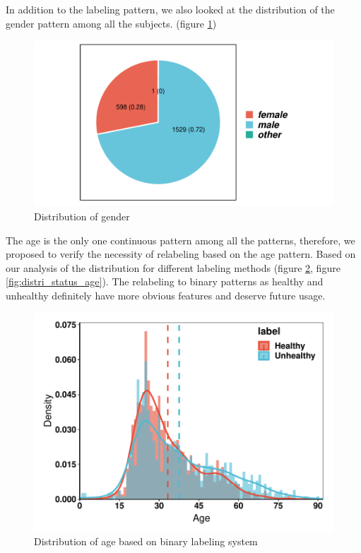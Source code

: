 \documentclass[11pt]{article}
\begin{document}
In addition to the labeling pattern, we also looked at the distribution of the gender pattern among all the subjects. (figure \ref{fig:pie_gender})

\begin{figure}[htbp]{}
	\centering
    \includegraphics[width=.8\textwidth]{./imgs/pie_gender.pdf} %
    \caption{Distribution of gender}
    \label{fig:pie_gender}
\end{figure}

The age is the only one continuous pattern among all the patterns, therefore, we proposed to verify the necessity of relabeling based on the age pattern. Based on our analysis of the distribution for different labeling methods (figure \ref{fig:distri_label_age}, figure \ref{fig:distri_status_age}). The relabeling to binary patterns as healthy and unhealthy definitely have more obvious features and deserve future usage.

\begin{figure}[htbp]{}
	\centering
    \includegraphics[width=.8\textwidth]{./imgs/distri_label_age.pdf} %
    \caption{Distribution of age based on binary labeling system}
    \label{fig:distri_label_age}
\end{figure}
\end{document}
